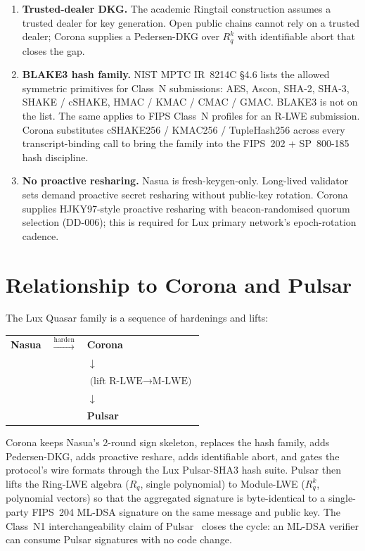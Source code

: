 \documentclass[11pt,a4paper]{article}
\theoremstyle{definition}
\theoremstyle{remark}
\newcommand{\Rq}{R_q}
\begin{document}
\begin{enumerate}[leftmargin=*, itemsep=0pt]
\item \textbf{Trusted-dealer DKG.} The academic Ringtail
construction assumes a trusted dealer for key generation. Open
public chains cannot rely on a trusted dealer; Corona supplies a
Pedersen-DKG over $\Rq^k$ with identifiable abort that closes the
gap.
\item \textbf{BLAKE3 hash family.} NIST MPTC IR~8214C \S4.6 lists
the allowed symmetric primitives for Class~N submissions:
AES, Ascon, SHA-2, SHA-3, SHAKE / cSHAKE, HMAC / KMAC / CMAC / GMAC.
BLAKE3 is not on the list. The same applies to FIPS Class~N
profiles for an R-LWE submission. Corona substitutes
cSHAKE256 / KMAC256 / TupleHash256 across every transcript-binding
call to bring the family into the FIPS~202 + SP~800-185
hash discipline.
\item \textbf{No proactive resharing.} Nasua is fresh-keygen-only.
Long-lived validator sets demand proactive secret resharing without
public-key rotation. Corona supplies HJKY97-style proactive
resharing with beacon-randomised quorum selection (DD-006); this is
required for Lux primary network's epoch-rotation cadence.
\end{enumerate}

\section{Relationship to Corona and Pulsar}
\label{sec:relationship}

The Lux Quasar family is a sequence of hardenings and lifts:

\begin{center}
\begin{tabular}{r c l}
\textbf{Nasua} & $\xrightarrow{\text{harden}}$ & \textbf{Corona} \\
                 &                                & \quad $\downarrow$ \\
                 &                                & \quad $\text{(lift R-LWE} \to \text{M-LWE)}$ \\
                 &                                & \quad $\downarrow$ \\
                 &                                & \textbf{Pulsar} \\
\end{tabular}
\end{center}

Corona keeps Nasua's 2-round sign skeleton, replaces the hash
family, adds Pedersen-DKG, adds proactive reshare, adds
identifiable abort, and gates the protocol's wire formats through
the Lux Pulsar-SHA3 hash suite. Pulsar then lifts the Ring-LWE
algebra ($\Rq$, single polynomial) to Module-LWE
($\Rq^k$, polynomial vectors) so that the aggregated signature is
byte-identical to a single-party FIPS~204 ML-DSA signature on the
same message and public key. The Class~N1 interchangeability claim
of Pulsar~\cite{pulsar} closes the cycle: an ML-DSA verifier can
consume Pulsar signatures with no code change.
\end{document}
